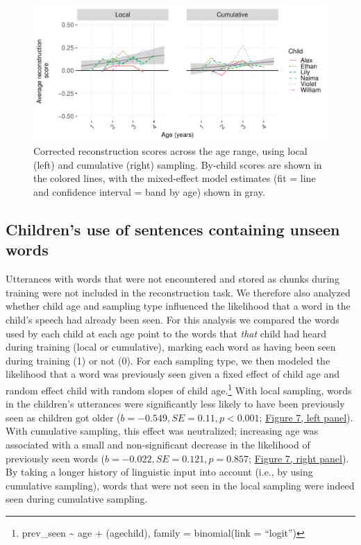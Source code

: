 \documentclass[
  english,
  man,floatsintext]{apa6}
\begin{document}
\begin{figure}
\includegraphics[width=0.95\linewidth]{CBL-age_invariance_files/figure-latex/fig6-1} \caption{Corrected reconstruction scores across the age range, using local (left) and cumulative (right) sampling. By-child scores are shown in the colored lines, with the mixed-effect model estimates (fit = line and confidence interval = band by age) shown in gray.}\label{fig:fig6}
\end{figure}

\hypertarget{childrens-use-of-sentences-containing-unseen-words}{%
\subsection{Children's use of sentences containing unseen words}\label{childrens-use-of-sentences-containing-unseen-words}}

Utterances with words that were not encountered and stored as chunks during training were not included in the reconstruction task. We therefore also analyzed whether child age and sampling type influenced the likelihood that a word in the child's speech had already been seen. For this analysis we compared the words used by each child at each age point to the words that \emph{that} child had heard during training (local or cumulative), marking each word as having been seen during training (1) or not (0). For each sampling type, we then modeled the likelihood that a word was previously seen given a fixed effect of child age and random effect child with random slopes of child age.\footnote{prev\_seen \textasciitilde{} age + (age\textbar child), family = binomial(link = \enquote{logit})} With local sampling, words in the children's utterances were significantly less likely to have been previously seen as children got older (\(b = -0.549, SE = 0.11, p < 0.001\); \protect\hyperlink{fig7}{Figure 7, left panel}). With cumulative sampling, this effect was neutralized; increasing age was associated with a small and non-significant decrease in the likelihood of previously seen words (\(b = -0.022, SE = 0.121, p = 0.857\); \protect\hyperlink{fig7}{Figure 7, right panel}). By taking a longer history of linguistic input into account (i.e., by using cumulative sampling), words that were not seen in the local sampling were indeed seen during cumulative sampling.
\end{document}
